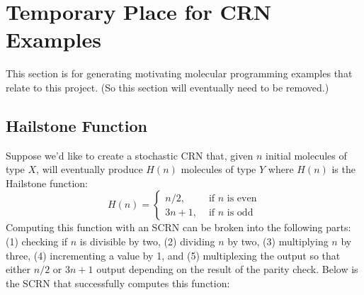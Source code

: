 
\section{Temporary Place for CRN Examples}
This section is for generating motivating molecular programming examples that relate to this project.
(So this section will eventually need to be removed.)

\subsection{Hailstone Function}
Suppose we'd like to create a stochastic CRN that, given \( n \) initial molecules of type \( X \), will eventually produce \( H(n) \) molecules of type \( Y \) where \( H(n) \) is the Hailstone function:
\begin{equation}
    H(n) = \begin{cases}
        n/2, &\text{ if }n\text{ is even}\\
        3n+1, &\text{ if }n\text{ is odd}
    \end{cases}
\end{equation}
Computing this function with an SCRN can be broken into the following parts: (1) checking if \( n \) is divisible by two, (2) dividing \( n \) by two, (3) multiplying \( n \) by three, (4) incrementing a value by 1, and (5) multiplexing the output so that either \( n/2 \) or \( 3n+1 \) output depending on the result of the parity check.
Below is the SCRN that successfully computes this function:
